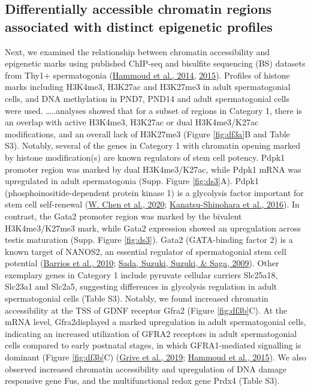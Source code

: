 \documentclass[12pt,twoside]{reedthesis}
\begin{document}
\hypertarget{differentially-accessible-chromatin-regions-associated-with-distinct-epigenetic-profiles}{%
\subsection{Differentially accessible chromatin regions associated with distinct epigenetic profiles}\label{differentially-accessible-chromatin-regions-associated-with-distinct-epigenetic-profiles}}

Next, we examined the relationship between chromatin accessibility and
epigenetic marks using published ChIP-seq and bisulfite sequencing (BS)
datasets from Thy1+ spermatogonia (\protect\hyperlink{ref-hammoud2014}{Hammoud et al., 2014}, \protect\hyperlink{ref-hammoud2015}{2015}). Profiles
of histone marks including H3K4me3, H3K27ac and H3K27me3 in adult
spermatogonial cells, and DNA methylation in PND7, PND14 and adult
spermatogonial cells were used. \ldots..analyses showed that for a subset
of regions in Category 1, there is an overlap with active H3K4me3,
H3K27ac or dual H3K4me3/K27ac modifications, and an overall lack of
H3K27me3 (Figure \ref{fig:df3a}B and Table S3). Notably, several of the genes in
Category 1 with chromatin opening marked by histone modification(s) are
known regulators of stem cell potency. Pdpk1 promoter region was marked
by dual H3K4me3/K27ac, while Pdpk1 mRNA was upregulated in adult
spermatogonia (Supp. Figure \ref{fig:ds3}A). Pdpk1 (phosphoinositide-dependent protein
kinase 1) is a glycolysis factor important for stem cell self-renewal
(\protect\hyperlink{ref-chen2020}{W. Chen et al., 2020}; \protect\hyperlink{ref-kanatsu-shinohara2016}{Kanatsu-Shinohara et al., 2016}). In contrast, the Gata2 promoter
region was marked by the bivalent H3K4me3/K27me3 mark, while Gata2
expression showed an upregulation across testis maturation (Supp. Figure \ref{fig:ds3}).
Gata2 (GATA-binding factor 2) is a known target of NANOS2, an essential
regulator of spermatogonial stem cell potential (\protect\hyperlink{ref-barrios2010}{Barrios et al., 2010}; \protect\hyperlink{ref-sada2009}{Sada, Suzuki, Suzuki, \& Saga, 2009}). Other exemplary genes in Category 1 include pyruvate
cellular carriers Slc25a18, Slc23a1 and Slc2a5, suggesting differences
in glycolysis regulation in adult spermatogonial cells (Table S3).
Notably, we found increased chromatin accessibility at the TSS of GDNF
receptor Gfra2 (Figure \ref{fig:df3b}C). At the mRNA level, Gfra2displayed a marked
upregulation in adult spermatogonial cells, indicating an increased
utilization of GFRA2 receptors in adult spermatogonial cells compared to
early postnatal stages, in which GFRA1-mediated signalling is dominant
(Figure \ref{fig:df3b}C) (\protect\hyperlink{ref-grive2019}{Grive et al., 2019}; \protect\hyperlink{ref-hammoud2015}{Hammoud et al., 2015}). We also observed increased
chromatin accessibility and upregulation of DNA damage responsive gene
Fus, and the multifunctional redox gene Prdx4 (Table S3).
\end{document}
